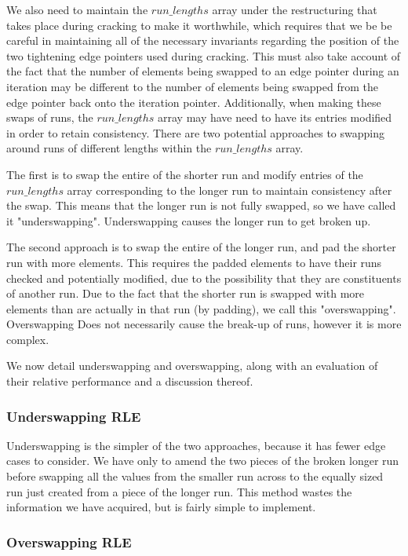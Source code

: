 We also need to maintain the $run\_lengths$ array under the restructuring that takes place during
cracking to make it worthwhile, which requires that we be be careful in maintaining all of the
necessary invariants regarding the position of the two tightening edge pointers used during cracking.
This must also take account of the fact that the number of elements being swapped to an edge
pointer during an iteration may be different to the number of elements being swapped from the edge
pointer back onto the iteration pointer. Additionally, when making these swaps of runs, the
$run\_lengths$ array may have need to have its entries modified in order to retain consistency. There
are two potential approaches to swapping around runs of different lengths within the
$run\_lengths$ array.

The first is to swap the entire of the shorter run and modify entries of the $run\_lengths$ array
corresponding to the longer run to maintain consistency after the swap. This means that the longer
run is not fully swapped, so we have called it "underswapping". Underswapping causes the longer run
to get broken up.

The second approach is to swap the entire of the longer run, and pad the shorter run with more
elements. This requires the padded elements to have their runs checked and potentially modified, due
to the possibility that they are constituents of another run. Due to the fact that the shorter run is
swapped with more elements than are actually in that run (by padding), we call this "overswapping".
Overswapping Does not necessarily cause the break-up of runs, however it is more complex.

We now detail underswapping and overswapping, along with an evaluation of their relative performance
and a discussion thereof.

\subsubsection{Underswapping RLE}

Underswapping is the simpler of the two approaches, because it has fewer edge cases to consider. We
have only to amend the two pieces of the broken longer run before swapping all the values from the
smaller run across to the equally sized run just created from a piece of the longer run. This method
wastes the information we have acquired, but is fairly simple to implement.

\subsubsection{Overswapping RLE}

